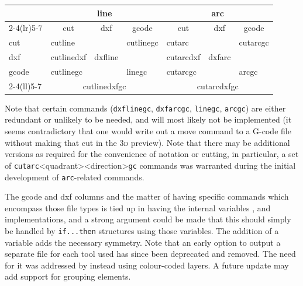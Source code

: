 \documentclass{ltxdoc}
\begin{document}
\begin{center}
\noindent\begin{tabular}{lllllll}\toprule
& \multicolumn{3}{c}{line} & \multicolumn{3}{c}{arc}
\\\cmidrule(lr){2-4}\cmidrule(lr){5-7}
      & \multicolumn{1}{c}{cut}& \multicolumn{1}{c}{dxf}& \multicolumn{1}{c}{gcode}& \multicolumn{1}{c}{cut}& \multicolumn{1}{c}{dxf}& \multicolumn{1}{c}{gcode}\\\midrule
cut   & cutline\hphantom{dxf}  &                        &  cutlinegc               & cutarc\hphantom{dxf}   &                        & cutarcgc            \\
dxf   & cutlinedxf             & dxfline\hphantom{gc}   &                          & cutarcdxf              & dxfarc\hphantom{gc}    &                     \\
gcode & cutlinegc              & \hphantom{dxflinegc}   & linegc\hphantom{cut}     & cutarcgc               & \hphantom{dxfarcgc}    & arcgc\hphantom{cut} \\\cmidrule(ll){2-4}\cmidrule(ll){5-7}
& \multicolumn{3}{c}{cutlinedxfgc}                                         & \multicolumn{3}{c}{cutarcdxfgc}\\\bottomrule
\end{tabular}
\end{center}

\noindent Note that certain commands (\verb|dxflinegc|, \verb|dxfarcgc|, \verb|linegc|, \verb|arcgc|) are either redundant or unlikely to be needed, and will most likely not be implemented (it seems contradictory that one would write out a move command to a G-code file without making that cut in the \textsc{3d} preview). Note that there may be additional versions as required for the convenience of notation or cutting, in particular, a set of \verb|cutarc|<quadrant><direction>\verb|gc| commands was warranted during the initial development of \verb|arc|-related commands.

The gcode and dxf columns and the matter of having specific commands which encompass those file types is tied up in having the internal variables ,  and implementations, and a strong argument could be made that this should simply be handled by \verb|if...then| structures using those variables. The addition of a  variable adds the necessary symmetry. Note that an early option to output a separate file for each tool used has since been deprecated and removed. The need for it was addressed by instead using colour-coded layers. A future update may add support for grouping elements.
\end{document}
